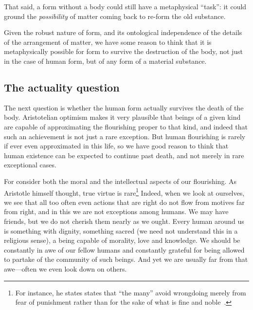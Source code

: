 That said, a form without a body could still have a metaphysical ``task'': it could ground the \textit{possibility} of matter coming back
to re-form the old substance. 

Given the robust nature of form, and its ontological independence of the details of the arrangement of matter, we have some 
reason to think that it is metaphysically possible for form to survive the destruction of the body, not just in the case of 
human form, but of any form of a material substance.

\subsection{The actuality question}
The next question is whether the human form actually survives the death of the body. Aristotelian optimism makes it very 
plausible that beings of a given kind are capable of approximating the flourishing proper to that kind, and indeed that such 
an achievement is not just a rare exception. But human flourishing is rarely if ever even approximated in this life, so we have 
good reason to think that human existence can be expected to continue past death, and not merely in rare exceptional cases. 

For consider both the moral and the intellectual aspects of our flourishing. As Aristotle himself thought, true virtue is 
rare\footnote{For instance, he states states that ``the many'' avoid wrongdoing merely from fear of punishment rather than for the sake of what is fine and noble~\parencite[10.9]{AristotleNE}.} Indeed, when we look at ourselves, we see that all too often even actions that are right do not flow from motives far from 
right, and in this we are not exceptions among humans. We may have friends, but we do not cherish them nearly as we ought. 
Every human around us is something with dignity, something sacred (we need not understand this in a religious sense), a being capable of morality, love and knowledge. We should be constantly in awe of our fellow humans and constantly grateful for being allowed 
to partake of the community of such beings. And yet we are usually far from that awe---often we even look down on others. 

